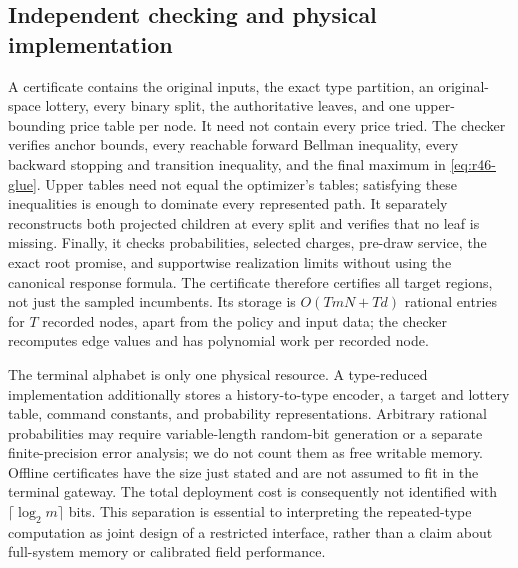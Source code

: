 \subsection{Independent checking and physical implementation}
A certificate contains the original inputs, the exact type partition, an original-space lottery, every binary split, the authoritative leaves, and one upper-bounding price table per node. It need not contain every price tried. The checker verifies anchor bounds, every reachable forward Bellman inequality, every backward stopping and transition inequality, and the final maximum in \eqref{eq:r46-glue}. Upper tables need not equal the optimizer's tables; satisfying these inequalities is enough to dominate every represented path. It separately reconstructs both projected children at every split and verifies that no leaf is missing. Finally, it checks probabilities, selected charges, pre-draw service, the exact root promise, and supportwise realization limits without using the canonical response formula. The certificate therefore certifies all target regions, not just the sampled incumbents. Its storage is $O(TmN+Td)$ rational entries for $T$ recorded nodes, apart from the policy and input data; the checker recomputes edge values and has polynomial work per recorded node.

The terminal alphabet is only one physical resource. A type-reduced implementation additionally stores a history-to-type encoder, a target and lottery table, command constants, and probability representations. Arbitrary rational probabilities may require variable-length random-bit generation or a separate finite-precision error analysis; we do not count them as free writable memory. Offline certificates have the size just stated and are not assumed to fit in the terminal gateway. The total deployment cost is consequently not identified with $\lceil\log_2m\rceil$ bits. This separation is essential to interpreting the repeated-type computation as joint design of a restricted interface, rather than a claim about full-system memory or calibrated field performance.
